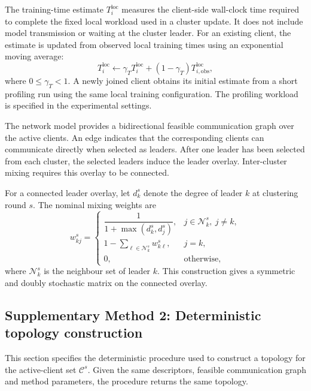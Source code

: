 \documentclass[pdflatex,sn-mathphys-num]{sn-jnl}
\begin{document}
The training-time estimate \(T_i^{\mathrm{loc}}\) measures the client-side wall-clock time required to complete the fixed local workload used in a cluster update. It does not include model transmission or waiting at the cluster leader. For an existing client, the estimate is updated from observed local training times using an exponential moving average:
\begin{equation}
T_i^{\mathrm{loc}}
\leftarrow
\gamma_T T_i^{\mathrm{loc}}
+
(1-\gamma_T)
T_{i,\mathrm{obs}}^{\mathrm{loc}},
\label{eq:supp_time_update}
\end{equation}
where \(0\leq\gamma_T<1\). A newly joined client obtains its initial estimate from a short profiling run using the same local training configuration. The profiling workload is specified in the experimental settings.

The network model provides a bidirectional feasible communication graph over the active clients. An edge indicates that the corresponding clients can communicate directly when selected as leaders. After one leader has been selected from each cluster, the selected leaders induce the leader overlay. Inter-cluster mixing requires this overlay to be connected.

For a connected leader overlay, let \(d_k^s\) denote the degree of leader \(k\) at clustering round \(s\). The nominal mixing weights are
\begin{equation}
w_{kj}^s
=
\begin{cases}
\dfrac{1}{1+\max(d_k^s,d_j^s)},
&
j\in\mathcal{N}_k^s,\ j\neq k,
\\[6pt]
1-\displaystyle\sum_{\ell\in\mathcal{N}_k^s}w_{k\ell}^s,
&
j=k,
\\[6pt]
0,
&
\text{otherwise},
\end{cases}
\label{eq:supp_metropolis_weights}
\end{equation}
where \(\mathcal{N}_k^s\) is the neighbour set of leader \(k\). This construction gives a symmetric and doubly stochastic matrix on the connected overlay.


\subsection{Supplementary Method 2: Deterministic topology construction}
\label{supp:deterministic_topology_construction}

This section specifies the deterministic procedure used to construct a topology for the active-client set \(\mathcal{C}^s\). Given the same descriptors, feasible communication graph and method parameters, the procedure returns the same topology.
\end{document}
